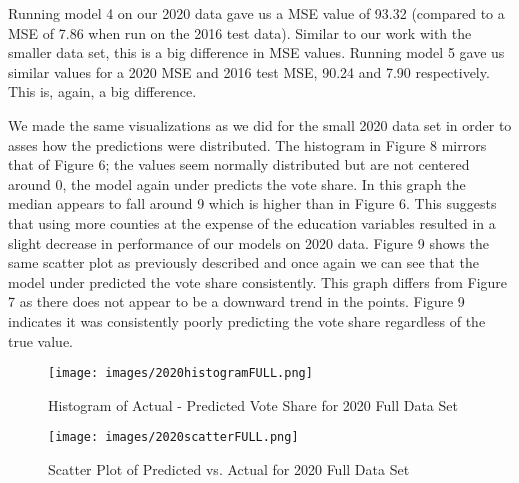\documentclass[letterpaper, twocolumn]{article}
\begin{document}
Running model 4 on our 2020 data gave us a MSE value of 93.32 (compared to a MSE of 7.86 when run on the 2016 test data). Similar to our work with the smaller data set, this is a big difference in MSE values. Running model 5 gave us similar values for a 2020 MSE and 2016 test MSE, 90.24 and 7.90 respectively. This is, again, a big difference. 

We made the same visualizations as we did for the small 2020 data set in order to asses how the predictions were distributed. The histogram in Figure 8 mirrors that of Figure 6; the values seem normally distributed but are not centered around 0, the model again under predicts the vote share. In this graph the median appears to fall around 9 which is higher than in Figure 6. This suggests that using more counties at the expense of the education variables resulted in a slight decrease in performance of our models on 2020 data. Figure 9 shows the same scatter plot as previously described and once again we can see that the model under predicted the vote share consistently. This graph differs from Figure 7 as there does not appear to be a downward trend in the points. Figure 9 indicates it was consistently poorly predicting the vote share regardless of the true value. 



\begin{figure}[h]
    \centering
    \texttt{[image: images/2020histogramFULL.png]}
    \caption{\centering Histogram of Actual - Predicted Vote Share for 2020 Full Data Set}
    \label{fig:arstmade}
\end{figure}

\begin{figure}[h]
    \centering
    \texttt{[image: images/2020scatterFULL.png]}
    \caption{\centering Scatter Plot of Predicted vs. Actual for 2020 Full Data Set}
    \label{fig:arstmade}
\end{figure}
\end{document}
